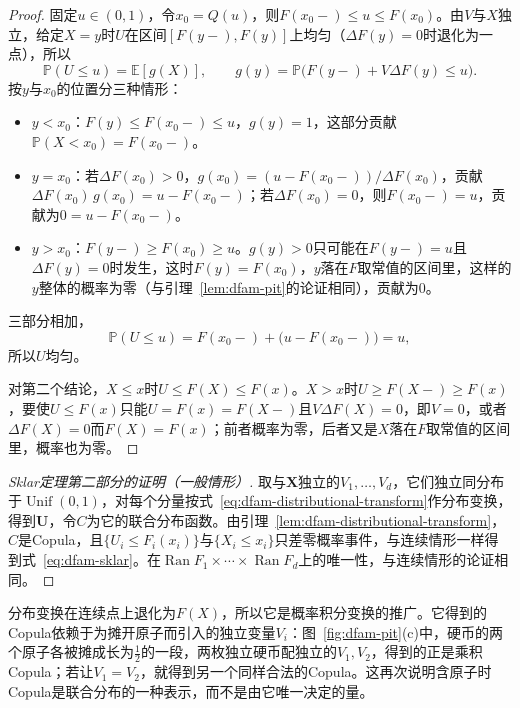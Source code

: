 \begin{proof}
固定$u\in(0,1)$，令$x_0=Q(u)$，则$F(x_0-)\leq u\leq F(x_0)$。由$V$与$X$独立，给定$X=y$时$U$在区间$[F(y-),F(y)]$上均匀（$\Delta F(y)=0$时退化为一点），所以
\[
  \mathbb{P}(U\leq u)=\mathbb{E}[g(X)],\qquad g(y)=\mathbb{P}\bigl(F(y-)+V\Delta F(y)\leq u\bigr).
\]
按$y$与$x_0$的位置分三种情形：
\begin{itemize}
  \item $y<x_0$：$F(y)\leq F(x_0-)\leq u$，$g(y)=1$，这部分贡献$\mathbb{P}(X<x_0)=F(x_0-)$。
  \item $y=x_0$：若$\Delta F(x_0)>0$，$g(x_0)=(u-F(x_0-))/\Delta F(x_0)$，贡献$\Delta F(x_0)\,g(x_0)=u-F(x_0-)$；若$\Delta F(x_0)=0$，则$F(x_0-)=u$，贡献为$0=u-F(x_0-)$。
  \item $y>x_0$：$F(y-)\geq F(x_0)\geq u$。$g(y)>0$只可能在$F(y-)=u$且$\Delta F(y)=0$时发生，这时$F(y)=F(x_0)$，$y$落在$F$取常值的区间里，这样的$y$整体的概率为零（与引理~\ref{lem:dfam-pit}的论证相同），贡献为$0$。
\end{itemize}
三部分相加，
\[
  \mathbb{P}(U\leq u)=F(x_0-)+\bigl(u-F(x_0-)\bigr)=u ,
\]
所以$U$均匀。

对第二个结论，$X\leq x$时$U\leq F(X)\leq F(x)$。$X>x$时$U\geq F(X-)\geq F(x)$，要使$U\leq F(x)$只能$U=F(x)=F(X-)$且$V\Delta F(X)=0$，即$V=0$，或者$\Delta F(X)=0$而$F(X)=F(x)$；前者概率为零，后者又是$X$落在$F$取常值的区间里，概率也为零。
\end{proof}

\begin{proof}[Sklar定理第二部分的证明（一般情形）]
取与$\bm{X}$独立的$V_1,\dots,V_d$，它们独立同分布于$\operatorname{Unif}(0,1)$，对每个分量按式~\eqref{eq:dfam-distributional-transform}作分布变换，得到$\bm{U}$，令$C$为它的联合分布函数。由引理~\ref{lem:dfam-distributional-transform}，$C$是Copula，且$\{U_i\leq F_i(x_i)\}$与$\{X_i\leq x_i\}$只差零概率事件，与连续情形一样得到式~\eqref{eq:dfam-sklar}。在$\operatorname{Ran}F_1\times\cdots\times\operatorname{Ran}F_d$上的唯一性，与连续情形的论证相同。
\end{proof}

分布变换在连续点上退化为$F(X)$，所以它是概率积分变换的推广。它得到的Copula依赖于为摊开原子而引入的独立变量$V_i$：图~\ref{fig:dfam-pit}(c)中，硬币的两个原子各被摊成长为$\tfrac12$的一段，两枚独立硬币配独立的$V_1,V_2$，得到的正是乘积Copula；若让$V_1=V_2$，就得到另一个同样合法的Copula。这再次说明含原子时Copula是联合分布的一种表示，而不是由它唯一决定的量。
